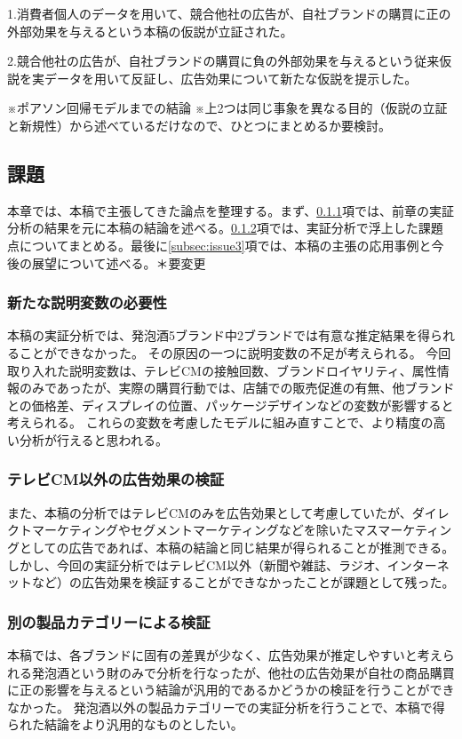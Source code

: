 \documentclass[11pt]{jsarticle}
\begin{document}
1.消費者個人のデータを用いて、競合他社の広告が、自社ブランドの購買に正の外部効果を与えるという本稿の仮説が立証された。

2.競合他社の広告が、自社ブランドの購買に負の外部効果を与えるという従来仮説を実データを用いて反証し、広告効果について新たな仮説を提示した。


※ポアソン回帰モデルまでの結論
※上2つは同じ事象を異なる目的（仮説の立証と新規性）から述べているだけなので、ひとつにまとめるか要検討。

\subsection{課題}
\label{sec:issue}
本章では、本稿で主張してきた論点を整理する。まず、\ref{subsec:issue1}項では、前章の実証分析の結果を元に本稿の結論を述べる。\ref{subsec:issue2}項では、実証分析で浮上した課題点についてまとめる。最後に\ref{subsec:issue3}項では、本稿の主張の応用事例と今後の展望について述べる。＊要変更

\subsubsection{新たな説明変数の必要性}
\label{subsec:issue1}
本稿の実証分析では、発泡酒5ブランド中2ブランドでは有意な推定結果を得られることができなかった。
その原因の一つに説明変数の不足が考えられる。
今回取り入れた説明変数は、テレビCMの接触回数、ブランドロイヤリティ、属性情報のみであったが、実際の購買行動では、店舗での販売促進の有無、他ブランドとの価格差、ディスプレイの位置、パッケージデザインなどの変数が影響すると考えられる。
これらの変数を考慮したモデルに組み直すことで、より精度の高い分析が行えると思われる。

\subsubsection{テレビCM以外の広告効果の検証}
 \label{subsec:issue2}
また、本稿の分析ではテレビCMのみを広告効果として考慮していたが、ダイレクトマーケティングやセグメントマーケティングなどを除いたマスマーケティングとしての広告であれば、本稿の結論と同じ結果が得られることが推測できる。
しかし、今回の実証分析ではテレビCM以外（新聞や雑誌、ラジオ、インターネットなど）の広告効果を検証することができなかったことが課題として残った。

\subsubsection{別の製品カテゴリーによる検証}
 \label{issue3}
本稿では、各ブランドに固有の差異が少なく、広告効果が推定しやすいと考えられる発泡酒という財のみで分析を行なったが、他社の広告効果が自社の商品購買に正の影響を与えるという結論が汎用的であるかどうかの検証を行うことができなかった。
発泡酒以外の製品カテゴリーでの実証分析を行うことで、本稿で得られた結論をより汎用的なものとしたい。
\end{document}
